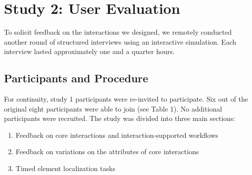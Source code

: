 \documentclass [11pt, proquest] {uwthesis}[2020/02/24]
\begin{document}
\section{Study 2: User Evaluation}
To solicit feedback on the interactions we designed, we remotely conducted another round of structured interviews using an interactive simulation. Each interview lasted approximately one and a quarter hours.

\subsection{Participants and Procedure}
For continuity, study 1 participants were re-invited to participate. Six out of the original eight participants were able to join (see Table 1). No additional participants were recruited. The study was divided into three main sections:

\begin{enumerate}
    \item Feedback on core interactions and interaction-supported workflows
    
    \item Feedback on variations on the attributes of core interactions 
    
    \item Timed element localization tasks  
\end{enumerate}
\end{document}
